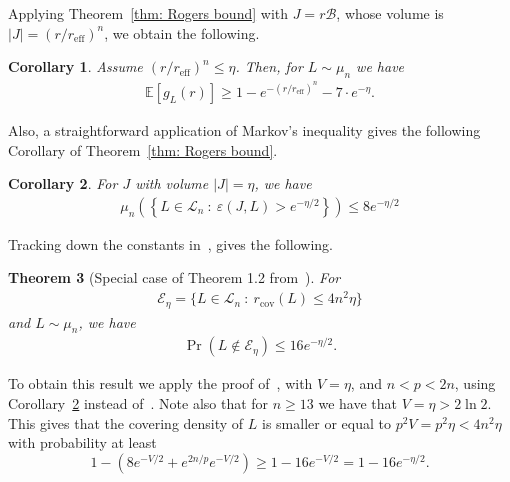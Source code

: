 \documentclass[article,doublecolumn]{IEEEtran}
\newcommand{\EE}{{\mathbb{E}}}
\newcommand{\LL}{{\mathcal L}}
\newcommand{\vre}{\varepsilon}
\newcommand{\BB}{{\mathcal{B}}}
\newcommand{\rcov}{{r_{\mathrm{cov}}}}
\newcommand{\reff}{{r_{\mathrm{eff}}}}
\newtheorem{thm}{Theorem}[section]
\newtheorem{cor}[thm]{Corollary}
\begin{document}
Applying Theorem~\ref{thm: Rogers bound} with $J=r\BB$, whose volume is $|J|=(r/\reff)^n$, we obtain the following.
\begin{cor}
Assume $(r/\reff)^n\leq\eta$. Then, for $L\sim\mu_n$ we have
\begin{align}
\EE[g_L(r)]\geq 1-e^{-(r/\reff)^n}- 7 \cdot e^{-\eta}.   
\end{align}
\label{cor:rog}
\end{cor}

Also, a straightforward application of Markov's inequality gives the following Corollary of Theorem~\ref{thm: Rogers bound}.
\begin{cor}
For $J$ with volume $|J|=\eta$, we have
\begin{align}
\mu_n\left(\left\{L\in\LL_n~:~\vre(J,L)>e^{-\eta/2}\right\} \right)\leq 8 e^{-\eta/2}    
\end{align}
\label{cor:schmidtMarkov}
\end{cor}

Tracking down the constants in~\cite[Theorem 1.2]{ORW21}, gives the following.
\begin{thm}[Special case of Theorem 1.2 from~\cite{ORW21}] For 
\begin{align}
\mathcal{E}_\eta=\{L\in\LL_n~:~\rcov(L)\leq 4 n^2 \eta\}    
\end{align}
and $L\sim \mu_n$, we have
\begin{align}
\Pr(L\notin \mathcal{E}_\eta)\leq 16 e^{-\eta/2}.    
\end{align}
\label{thm:orwconst}
\end{thm}
To obtain this result we apply the proof of~\cite[Theorem 1.2]{ORW21}, with $V=\eta$, and $n<p<2n$, using Corollary~\ref{cor:schmidtMarkov} instead of~\cite[Corollary 2.4]{ORW21}. Note also that for $n\geq 13$ we have that $V=\eta>2\ln 2$. This gives that the covering density of $L$ is smaller or equal to $p^2 V=p^2\eta<4n^2 \eta$ with probability at least $$1-\left(8e^{-V/2}+e^{2n/p}e^{-V/2}\right)\geq 1-16 e^{-V/2}=1-16 e^{-\eta/2}.$$

\medskip
\end{document}

